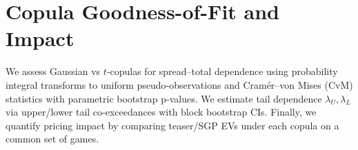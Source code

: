 \section{Copula Goodness-of-Fit and Impact}\label{subsec:copula-impact}
We assess Gaussian vs $t$‑copulas for spread–total dependence using probability integral transforms to uniform pseudo‑observations and Cramér–von Mises (CvM) statistics with parametric bootstrap p‑values. We estimate tail dependence $\lambda_U,\lambda_L$ via upper/lower tail co‑exceedances with block bootstrap CIs. Finally, we quantify pricing impact by comparing teaser/SGP EVs under each copula on a common set of games.



